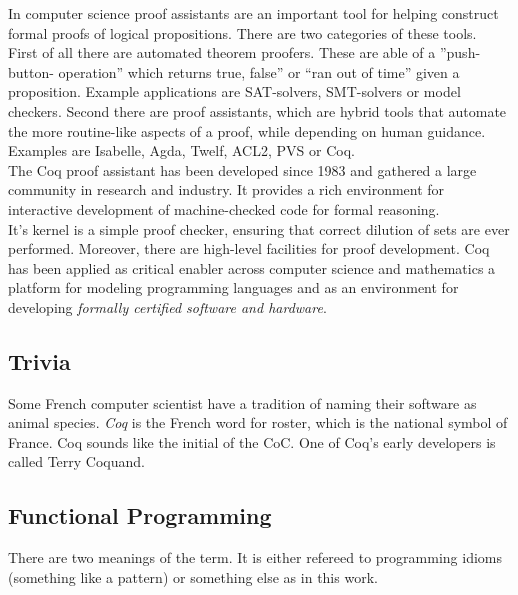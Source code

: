 In computer science proof assistants are an important tool for helping construct formal proofs of logical propositions.
There are two categories of these tools.\\
First of all there are automated theorem proofers. 
These are able of a ''push-button- operation'' which returns true, false'' or ``ran out of time'' given a proposition.
Example applications are \glspl{SAT-solver}, \glspl{SMT-solver} or \glspl{model checker}. 
Second there are proof assistants, which are hybrid tools that automate the more routine-like aspects of a proof, while depending on human guidance. 
Examples are \gls{Isabelle}, Agda, Twelf, ACL2, PVS or Coq.\\
The Coq proof assistant has been developed since 1983 and gathered a large community in research and industry.
It provides a rich environment for interactive development of machine-checked code for formal reasoning.\\
It's kernel is a simple proof checker, ensuring that correct dilution of sets are ever performed. 
Moreover, there are high-level facilities for proof development.
Coq has been applied as critical enabler across computer science and mathematics a platform for modeling programming languages and as an environment for developing {\itshape formally certified software and hardware}.
 

\subsection{Trivia}
\label{subsec:trivia}

Some French computer scientist have a tradition of naming their software as animal species.
{\itshape Coq} is the French word for roster, which is the national symbol of France.
Coq sounds like the initial of the \gls{CoC}.
One of Coq's early developers is called Terry Coquand.


\subsection{Functional Programming}
\label{subsection:functionalProgramming}

There are two meanings of the term. 
It is either refereed to programming idioms (something like a pattern) or something else as in this work.\\


